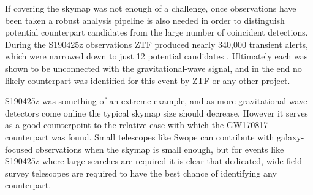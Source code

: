 \begin{colsection}
\begin{colsection}
If covering the skymap was not enough of a challenge, once observations have been taken a robust analysis pipeline is also needed in order to distinguish potential counterpart candidates from the large number of coincident detections. During the S190425z observations ZTF produced nearly 340,000 transient alerts, which were narrowed down to just 12 potential candidates \citep{S190425z_ZTF}. Ultimately each was shown to be unconnected with the gravitational-wave signal, and in the end no likely counterpart was identified for this event by ZTF or any other project.

S190425z was something of an extreme example, and as more gravitational-wave detectors come online the typical skymap size should decrease. However it serves as a good counterpoint to the relative ease with which the GW170817 counterpart was found. Small telescopes like Swope can contribute with galaxy-focused observations when the skymap is small enough, but for events like S190425z where large searches are required it is clear that dedicated, wide-field survey telescopes are required to have the best chance of identifying any counterpart.

\end{colsection}


\end{colsection}

\clearpage
\newpage
\hfuzz=6pt %
